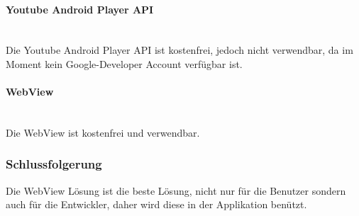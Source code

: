 \documentclass[FIPLY_base.tex]{subfiles}
\begin{document}
\paragraph{Youtube Android Player API}\ \\
Die Youtube Android Player API ist kostenfrei, jedoch nicht verwendbar, da im Moment kein Google-Developer Account verfügbar ist.
\paragraph{WebView}\ \\
Die WebView ist kostenfrei und verwendbar.
\subsubsection{Schlussfolgerung}
Die WebView Lösung ist die beste Lösung, nicht nur für die Benutzer sondern auch für die Entwickler, daher wird diese in der Applikation benützt.
\end{document}
